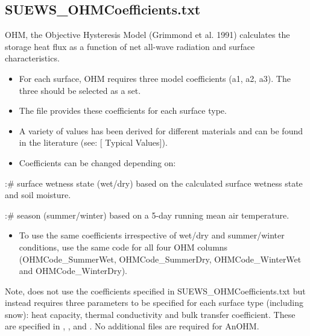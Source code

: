 \documentclass[letterpaper,10pt,english]{sphinxmanual}
\begin{document}
\subsection{SUEWS\_OHMCoefficients.txt}
\label{\detokenize{input_files/SUEWS_SiteInfo/SUEWS_OHMCoefficients::doc}}\label{\detokenize{input_files/SUEWS_SiteInfo/SUEWS_OHMCoefficients:suews-ohmcoefficients-txt}}\label{\detokenize{input_files/SUEWS_SiteInfo/SUEWS_OHMCoefficients:id1}}
OHM, the Objective Hysteresis Model (Grimmond et al. 1991) \label{\detokenize{input_files/SUEWS_SiteInfo/SUEWS_OHMCoefficients:id2}}{\hyperref[\detokenize{references:g91ohm}]{\sphinxcrossref{{[}G91OHM{]}}}}
calculates the storage heat flux as a function of net all-wave radiation
and surface characteristics.
\begin{itemize}
\item {} 
For each surface, OHM requires three model coefficients (a1, a2, a3).
The three should be selected as a set.

\item {} 
The  file provides these coefficients
for each surface type.

\item {} 
A variety of values has been derived for different materials and can
be found in the literature (see:
{[}\textbar{}
Typical Values{]}).

\item {} 
Coefficients can be changed depending on:

\end{itemize}

:\# surface wetness state (wet/dry) based on the calculated surface
wetness state and soil moisture.

:\# season (summer/winter) based on a 5-day running mean air temperature.
\begin{itemize}
\item {} 
To use the same coefficients irrespective of wet/dry and
summer/winter conditions, use the same code for all four OHM columns
(OHMCode\_SummerWet, OHMCode\_SummerDry, OHMCode\_WinterWet and
OHMCode\_WinterDry).

\end{itemize}

Note,  does not use the coefficients specified in
SUEWS\_OHMCoefficients.txt but instead requires three parameters to be
specified for each surface type (including snow): heat capacity, thermal
conductivity and bulk transfer coefficient. These are specified in
{\hyperref[\detokenize{input_files/SUEWS_SiteInfo/SUEWS_NonVeg:suews-nonveg-txt}]{}},
{\hyperref[\detokenize{input_files/SUEWS_SiteInfo/SUEWS_Veg:suews-veg-txt}]{}},
{\hyperref[\detokenize{input_files/SUEWS_SiteInfo/SUEWS_Water:suews-water-txt}]{}} and
{\hyperref[\detokenize{input_files/SUEWS_SiteInfo/SUEWS_Snow:suews-snow-txt}]{}}. No additional files are required
for AnOHM.
\end{document}
